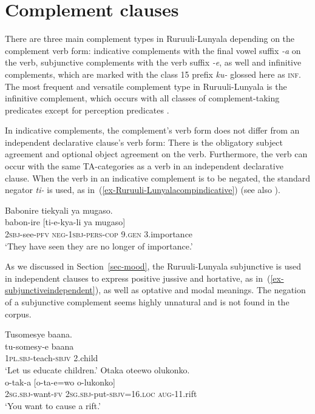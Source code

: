 \section{Complement clauses}\label{sec-syntax-complementation}

There are three main complement types in Ru\-ruu\-li\hyp{}Lu\-nya\-la depending on the complement verb form: indicative complements with the final vowel suffix \textit{-a} on the verb, subjunctive complements with the verb suffix \textit{-e}, as well and infinitive complements, which are marked with the class 15 prefix \textit{ku-} glossed here as \textsc{inf}. 
The most frequent and versatile complement type in Ru\-ruu\-li\hyp{}Lu\-nya\-la is the infinitive complement, which occurs with all classes of complement-taking predicates except for perception predicates  \citep{Sorensenetal2020Clausal}. 

In indicative complements, the complement's verb form does not differ from an independent declarative clause's verb form: 
There is the obligatory subject agreement and optional object agreement on the verb. 
Furthermore, the verb can occur with the same TA-categories as a verb in an independent declarative clause. 
When the verb in an indicative complement is to be negated, the standard negator \textit{ti-} is used, as in~(\ref{ex-Ruruuli-Lunyalacompindicative}) (see also \citealt{Sorensenetal2020Clausal}).

\ea 	\label{ex-Ruruuli-Lunyalacompindicative} 
	\glll Babonire tiekyali ya mugaso.\\
	  babon-ire [ti-e-kya-li ya mugaso]\\
		\textsc{2sbj}-see-\textsc{pfv} \textsc{neg}-\textsc{1sbj}-\textsc{pers}-\textsc{cop} 9.\textsc{gen} 3.importance\\
\glt ‘They have seen they are no longer of importance.’ 
\z

As we discussed in Section~\ref{sec-mood}, the Ru\-ruu\-li\hyp{}Lu\-nya\-la subjunctive is used in independent clauses to express positive jussive and hortative, as in~(\ref{ex-subjunctiveindependent}), as well as optative and modal meanings. 
The negation of a subjunctive complement seems highly unnatural and is not found in the corpus.

\ea \label{ex-ruulisubjunctivecompl}
\begin{xlist}
\ex \label{ex-subjunctiveindependent}
	\glll Tusomesye baana.\\
  tu-somesy-e baana\\
		1\textsc{pl.sbj}-teach-\textsc{sbjv} 2.child\\
	\glt ‘Let us educate children.’ 	
\ex \label{ex-subjunctivedependent}
	\glll Otaka  oteewo olukonko.\\ 
	 o-tak-a  [o-ta-e=wo o-lukonko]\\ 
		2\textsc{sg.sbj}-want-\textsc{fv}  2\textsc{sg.sbj}-put-\textsc{sbjv}=16.\textsc{loc} \textsc{aug}-11.rift\\
	\glt ‘You want to cause a rift.' 
\end{xlist}
\z

